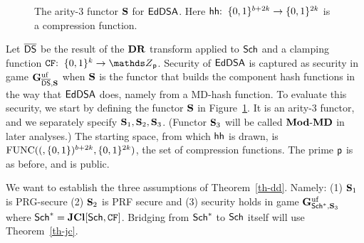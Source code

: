 \begin{figure}[t]
\vspace{-8pt}
\caption{The arity-3 functor $\mathbf{S}$ for $\mathsf{EdDSA}$. Here $\mathsf{hh}{:\;\;}\{0,1\}^{b+2k}\to\{0,1\}^{2k}$ is a compression function.}
\label{fig-our-functor}
\hrulefill
\vspace{-10pt}
\end{figure}




 Let $\overline{\mathsf{DS}}$ be the result of the $\mathbf{DR}$ transform applied to $\mathsf{Sch}$ and a clamping function $\CFEDSA\Colon\bits^k\to\Z_{\Prime}$. Security of $\mathsf{EdDSA}$ is captured as security in game $\mathbf{G}^{\mathrm{uf}}_{\overline{\mathsf{DS}},\mathbf{S}}$ when $\mathbf{S}$ is the functor that builds the component hash functions in the way that $\mathsf{EdDSA}$ does, namely from a MD-hash function. To evaluate this security, we start by defining the functor $\mathbf{S}$ in Figure~\ref{fig-our-functor}. It is an arity-3 functor, and we separately specify $\mathbf{S}_1,\mathbf{S}_2,\mathbf{S}_3$. (Functor $\mathbf{S}_3$ will be called $\mathbf{Mod\mbox{-}MD}$ in later analyses.) The starting space, from which $\mathsf{hh}$ is drawn, is $\mathrm{FUNC}((,\{0,1\})^{b+2k},\{0,1\}^{2k})$, the set of compression functions. The prime $\mathsf{p}$ is as before, and is public.


We want to establish the three assumptions of Theorem~\ref{th-dd}. Namely: (1) $\mathbf{S}_1$ is PRG-secure (2) $\mathbf{S}_2$ is PRF secure and (3) security holds in game $\mathbf{G}^{\mathrm{uf}}_{\mathsf{Sch}^*,\mathbf{S}_3}$ where $\mathsf{Sch}^* = \mathbf{JCl}[\mathsf{Sch},\mathtt{CF}]$. Bridging from $\mathsf{Sch}^*$ to $\mathsf{Sch}$ itself will use Theorem~\ref{th-jc}.

